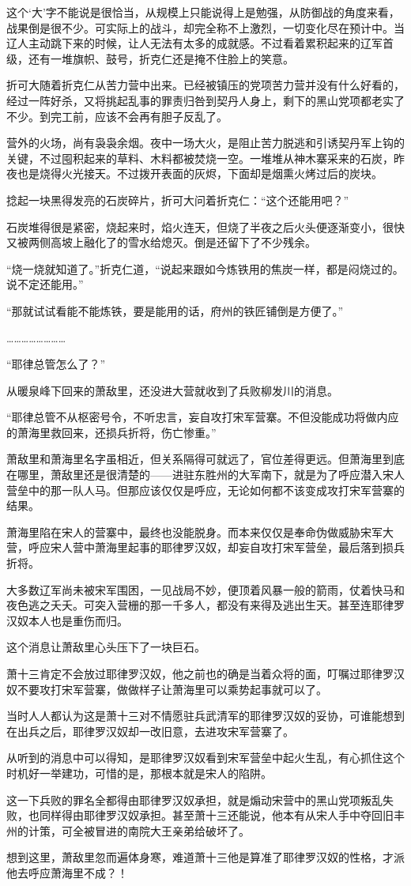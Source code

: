 这个‘大’字不能说是很恰当，从规模上只能说得上是勉强，从防御战的角度来看，战果倒是很不少。可实际上的战斗，却完全称不上激烈，一切变化尽在预计中。当辽人主动跳下来的时候，让人无法有太多的成就感。不过看着累积起来的辽军首级，还有一堆旗帜、鼓号，折克仁还是掩不住脸上的笑意。

折可大随着折克仁从苦力营中出来。已经被镇压的党项苦力营并没有什么好看的，经过一阵好杀，又将挑起乱事的罪责归咎到契丹人身上，剩下的黑山党项都老实了不少。到完工前，应该不会再有胆子反乱了。

营外的火场，尚有袅袅余烟。夜中一场大火，是阻止苦力脱逃和引诱契丹军上钩的关键，不过囤积起来的草料、木料都被焚烧一空。一堆堆从神木寨采来的石炭，昨夜也是烧得火光接天。不过拨开表面的灰烬，下面却是烟熏火烤过后的炭块。

捻起一块黑得发亮的石炭碎片，折可大问着折克仁：“这个还能用吧？”

石炭堆得很是紧密，烧起来时，焰火连天，但烧了半夜之后火头便逐渐变小，很快又被两侧高坡上融化了的雪水给熄灭。倒是还留下了不少残余。

“烧一烧就知道了。”折克仁道，“说起来跟如今炼铁用的焦炭一样，都是闷烧过的。说不定还能用。”

“那就试试看能不能炼铁，要是能用的话，府州的铁匠铺倒是方便了。”

……………………

“耶律总管怎么了？”

从暖泉峰下回来的萧敌里，还没进大营就收到了兵败柳发川的消息。

“耶律总管不从枢密号令，不听忠言，妄自攻打宋军营寨。不但没能成功将做内应的萧海里救回来，还损兵折将，伤亡惨重。”

萧敌里和萧海里名字虽相近，但关系隔得可就远了，官位差得更远。但萧海里到底在哪里，萧敌里还是很清楚的——进驻东胜州的大军南下，就是为了呼应潜入宋人营垒中的那一队人马。但那应该仅仅是呼应，无论如何都不该变成攻打宋军营寨的结果。

萧海里陷在宋人的营寨中，最终也没能脱身。而本来仅仅是奉命伪做威胁宋军大营，呼应宋人营中萧海里起事的耶律罗汉奴，却妄自攻打宋军营垒，最后落到损兵折将。

大多数辽军尚未被宋军围困，一见战局不妙，便顶着风暴一般的箭雨，仗着快马和夜色逃之夭夭。可突入营栅的那一千多人，都没有来得及逃出生天。甚至连耶律罗汉奴本人也是重伤而归。

这个消息让萧敌里心头压下了一块巨石。

萧十三肯定不会放过耶律罗汉奴，他之前也的确是当着众将的面，叮嘱过耶律罗汉奴不要攻打宋军营寨，做做样子让萧海里可以乘势起事就可以了。

当时人人都认为这是萧十三对不情愿驻兵武清军的耶律罗汉奴的妥协，可谁能想到在出兵之后，耶律罗汉奴却一改旧意，去进攻宋军营寨了。

从听到的消息中可以得知，是耶律罗汉奴看到宋军营垒中起火生乱，有心抓住这个时机好一举建功，可惜的是，那根本就是宋人的陷阱。

这一下兵败的罪名全都得由耶律罗汉奴承担，就是煽动宋营中的黑山党项叛乱失败，也同样得由耶律罗汉奴承担。甚至萧十三还能说，他本有从宋人手中夺回旧丰州的计策，可全被冒进的南院大王亲弟给破坏了。

想到这里，萧敌里忽而遍体身寒，难道萧十三他是算准了耶律罗汉奴的性格，才派他去呼应萧海里不成？！

